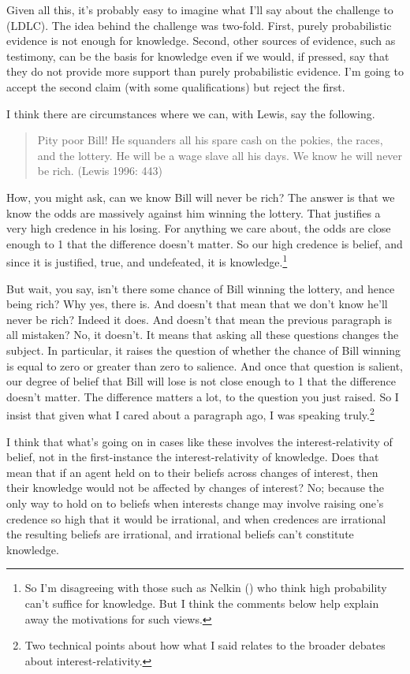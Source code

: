 \documentclass[
  10pt,
  letterpaper,
  DIV=11,
  numbers=noendperiod,
  twoside]{scrartcl}
\begin{document}
Given all this, it's probably easy to imagine what I'll say about the
challenge to (LDLC). The idea behind the challenge was two-fold. First,
purely probabilistic evidence is not enough for knowledge. Second, other
sources of evidence, such as testimony, can be the basis for knowledge
even if we would, if pressed, say that they do not provide more support
than purely probabilistic evidence. I'm going to accept the second claim
(with some qualifications) but reject the first.

I think there are circumstances where we can, with Lewis, say the
following.

\begin{quote}
Pity poor Bill! He squanders all his spare cash on the pokies, the
races, and the lottery. He will be a wage slave all his days. We know he
will never be rich. (Lewis 1996: 443)
\end{quote}

How, you might ask, can we know Bill will never be rich? The answer is
that we know the odds are massively against him winning the lottery.
That justifies a very high credence in his losing. For anything we care
about, the odds are close enough to 1 that the difference doesn't
matter. So our high credence is belief, and since it is justified, true,
and undefeated, it is knowledge.\footnote{So I'm disagreeing with those
  such as Nelkin () who think high
  probability can't suffice for knowledge. But I think the comments
  below help explain away the motivations for such views.}

But wait, you say, isn't there some chance of Bill winning the lottery,
and hence being rich? Why yes, there is. And doesn't that mean that we
don't know he'll never be rich? Indeed it does. And doesn't that mean
the previous paragraph is all mistaken? No, it doesn't. It means that
asking all these questions changes the subject. In particular, it raises
the question of whether the chance of Bill winning is equal to zero or
greater than zero to salience. And once that question is salient, our
degree of belief that Bill will lose is not close enough to 1 that the
difference doesn't matter. The difference matters a lot, to the question
you just raised. So I insist that given what I cared about a paragraph
ago, I was speaking truly.\footnote{Two technical points about how what
  I said relates to the broader debates about interest-relativity.}

I think that what's going on in cases like these involves the
interest-relativity of belief, not in the first-instance the
interest-relativity of knowledge. Does that mean that if an agent held
on to their beliefs across changes of interest, then their knowledge
would not be affected by changes of interest? No; because the only way
to hold on to beliefs when interests change may involve raising one's
credence so high that it would be irrational, and when credences are
irrational the resulting beliefs are irrational, and irrational beliefs
can't constitute knowledge.
\end{document}
